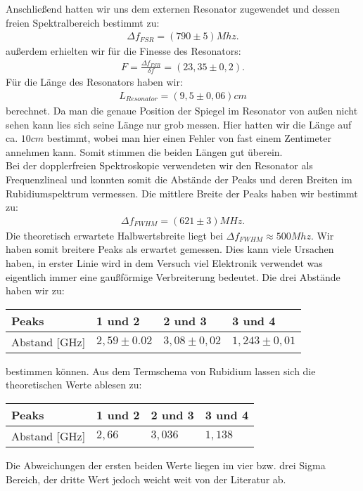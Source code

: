 \documentclass[12pt]{article}
\begin{document}
Anschließend hatten wir uns dem externen Resonator zugewendet und dessen freien Spektralbereich bestimmt zu:
\begin{align*}
 \Delta f_{FSR} = (790\pm5) Mhz.
\end{align*}
außerdem erhielten wir für die Finesse des Resonators:
\begin{align*}
 F = \frac{\Delta f_{FSR}}{\delta f} = ( 23,35 \pm 0,2 ).
\end{align*}
Für die Länge des Resonators haben wir:
\begin{align*}
 L_{Resonator}= (9,5 \pm 0,06) cm
\end{align*}
berechnet. Da man die genaue Position der Spiegel im Resonator von außen nicht sehen kann lies sich seine Länge nur grob messen. Hier hatten wir die Länge auf ca. $10cm$ bestimmt, wobei man hier einen Fehler von fast einem Zentimeter annehmen kann. Somit stimmen die beiden Längen gut überein.\\

Bei der dopplerfreien Spektroskopie verwendeten wir den Resonator als Frequenzlineal und konnten somit die Abstände der Peaks und deren Breiten im Rubidiumspektrum vermessen.
Die mittlere Breite der Peaks haben wir bestimmt zu:
\begin{align*}
 \Delta f_{FWHM} = (621 \pm 3) MHz.
\end{align*}
Die theoretisch erwartete Halbwertsbreite liegt bei $\Delta f_{FWHM} \approx 500 Mhz$. Wir haben somit breitere Peaks als erwartet gemessen. Dies kann viele Ursachen haben, in erster Linie wird in dem Versuch viel Elektronik verwendet was eigentlich immer eine gaußförmige Verbreiterung bedeutet.
Die drei Abstände haben wir zu:
\begin{table}[H]
\begin{center}
\begin{tabular}{|l|l|l|l|}
\hline
Peaks & 1 und 2 & 2 und 3 & 3 und 4\\
\hline
Abstand [GHz] & $2,59 \pm 0.02$ & $3,08 \pm 0,02$ & $1,243 \pm 0,01$\\
\hline
\end{tabular}
\end{center}
\end{table}
bestimmen können.
Aus dem Termschema von Rubidium lassen sich die theoretischen Werte ablesen zu:
\begin{table}[H]
\begin{center}
\begin{tabular}{|l|l|l|l|}
\hline
Peaks & 1 und 2 & 2 und 3 & 3 und 4\\
\hline
Abstand [GHz] & $2,66$ & $3,036$ & $1,138$\\
\hline
\end{tabular}
\end{center}
\end{table}
Die Abweichungen der ersten beiden Werte liegen im vier bzw. drei Sigma Bereich, der dritte Wert jedoch weicht weit von der Literatur ab.\\
\end{document}
